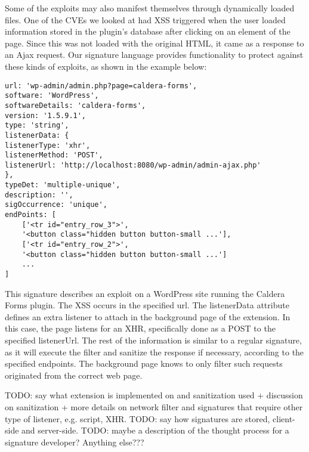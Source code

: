 Some of the exploits may also manifest themselves through dynamically loaded files. One of the CVEs we looked at had XSS triggered when the user loaded information stored in the plugin's database after clicking on an element of the page. Since this was not loaded with the original HTML, it came as a response to an Ajax request. Our signature language provides functionality to protect against these kinds of exploits, as shown in the example below:

 \lstset{basicstyle=\small}
\begin{lstlisting}
url: 'wp-admin/admin.php?page=caldera-forms',
software: 'WordPress',
softwareDetails: 'caldera-forms',
version: '1.5.9.1',
type: 'string',
listenerData: {
listenerType: 'xhr',
listenerMethod: 'POST',
listenerUrl: 'http://localhost:8080/wp-admin/admin-ajax.php'
},
typeDet: 'multiple-unique',
description: '',
sigOccurrence: 'unique',
endPoints: [
	['<tr id="entry_row_3">', 
	'<button class="hidden button button-small ...'],
	['<tr id="entry_row_2">', 
	'<button class="hidden button button-small ...']
	...
]
\end{lstlisting}

This signature describes an exploit on a WordPress site running the Caldera Forms plugin. The XSS occurs in the specified url. The listenerData attribute defines an extra listener to attach in the background page of the extension. In this case, the page listens for an XHR, specifically done as a POST to the specified listenerUrl. The rest of the information is similar to a regular signature, as it will execute the filter and sanitize the response if necessary, according to the specified endpoints. The background page knows to only filter such requests originated from the correct web page.

TODO: say what extension is implemented on and sanitization used + discussion on sanitization + more details on network filter and signatures that require other type of listener, e.g. script, XHR.
TODO: say how signatures are stored, client-side and server-side.
TODO: maybe a description of the thought process for a signature developer?
Anything else???